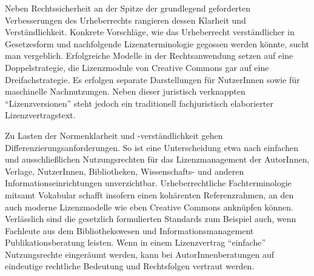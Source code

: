 \documentclass[output=paper]{langscibook}
\begin{document}
Neben Rechtssicherheit an der Spitze der grundlegend geforderten
Verbesserungen des Urheberrechts rangieren dessen Klarheit und
Verständlichkeit. Konkrete Vorschläge, wie das Urheberrecht
verständlicher in Gesetzesform und nachfolgende Lizenzterminologie
gegossen werden könnte, sucht man vergeblich. Erfolgreiche Modelle in
der Rechtsanwendung setzen auf eine Doppelstrategie, die Lizenzmodule
von Creative Commons gar auf eine Dreifachstrategie. Es erfolgen
separate Darstellungen für NutzerInnen sowie für maschinelle
Nachnutzungen. Neben dieser juristisch verknappten
\enquote{Lizenzversionen} steht jedoch ein traditionell fachjuristisch
elaborierter Lizenzvertragstext.

Zu Lasten der Normenklarheit und -verständlichkeit gehen
Differenzierungsanforderungen. So ist eine Unterscheidung etwa nach
einfachen und ausschließlichen Nutzungsrechten für das Lizenzmanagement
der AutorInnen, Verlage, NutzerInnen, Bibliotheken, Wissenschafts- und
anderen Informationseinrichtungen unverzichtbar. Urheberrechtliche
Fachterminologie mitsamt Vokabular schafft insofern einen kohärenten
Referenzrahmen, an den auch moderne Lizenzmodelle wie eben Creative
Commons anknüpfen können. Verlässlich sind die gesetzlich formulierten
Standards zum Beispiel auch, wenn Fachleute aus dem Bibliothekswesen und
Informationsmanagement Publikationsberatung leisten. Wenn in einem
Lizenzvertrag \enquote{einfache} Nutzungsrechte eingeräumt werden, kann
bei AutorInnenberatungen auf eindeutige rechtliche Bedeutung und
Rechtsfolgen vertraut werden.
\end{document}
